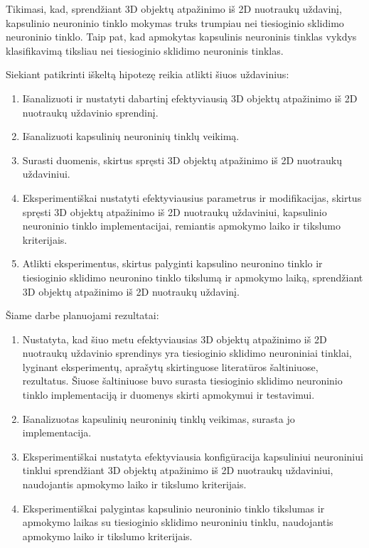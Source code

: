 Tikimasi, kad, sprendžiant 3D objektų atpažinimo iš 2D nuotraukų uždavinį, kapsulinio neuroninio tinklo mokymas truks trumpiau nei tiesioginio sklidimo neuroninio tinklo. Taip pat, kad apmokytas kapsulinis neuroninis tinklas vykdys klasifikavimą tiksliau nei tiesioginio sklidimo neuroninis tinklas.

Siekiant patikrinti iškeltą hipotezę reikia atlikti šiuos uždavinius:

\begin{enumerate}
	\item Išanalizuoti ir nustatyti dabartinį efektyviausią 3D objektų atpažinimo iš 2D nuotraukų uždavinio sprendinį.
	\item Išanalizuoti kapsulinių neuroninių tinklų veikimą.
	\item Surasti duomenis, skirtus spręsti 3D objektų atpažinimo iš 2D nuotraukų uždaviniui.
	\item Eksperimentiškai nustatyti efektyviausius parametrus ir modifikacijas, skirtus spręsti 3D objektų atpažinimo iš 2D nuotraukų uždaviniui, kapsulinio neuroninio tinklo implementacijai, remiantis apmokymo laiko ir tikslumo kriterijais.
	\item Atlikti eksperimentus, skirtus palyginti kapsulino neuronino tinklo ir tiesioginio sklidimo neuronino tinklo tikslumą ir apmokymo laiką, sprendžiant 3D objektų atpažinimo iš 2D nuotraukų uždavinį.
\end{enumerate}

Šiame darbe planuojami rezultatai:

\begin{enumerate}
	\item Nustatyta, kad šiuo metu efektyviausias 3D objektų atpažinimo iš 2D nuotraukų uždavinio sprendinys yra tiesioginio sklidimo neuroniniai tinklai, lyginant eksperimentų, aprašytų skirtinguose literatūros šaltiniuose, rezultatus. Šiuose šaltiniuose buvo surasta tiesioginio sklidimo neuroninio tinklo implementaciją ir duomenys skirti apmokymui ir testavimui.
	\item Išanalizuotas kapsulinių neuroninių tinklų veikimas, surasta jo implementacija.
	\item Eksperimentiškai nustatyta efektyviausia konfigūracija kapsuliniui neuroniniui tinklui sprendžiant 3D objektų atpažinimo iš 2D nuotraukų uždaviniui, naudojantis apmokymo laiko ir tikslumo kriterijais.
	\item Eksperimentiškai palygintas kapsulinio neuroninio tinklo tikslumas ir apmokymo laikas su tiesioginio sklidimo neuroniniu tinklu, naudojantis apmokymo laiko ir tikslumo kriterijais.
\end{enumerate}

